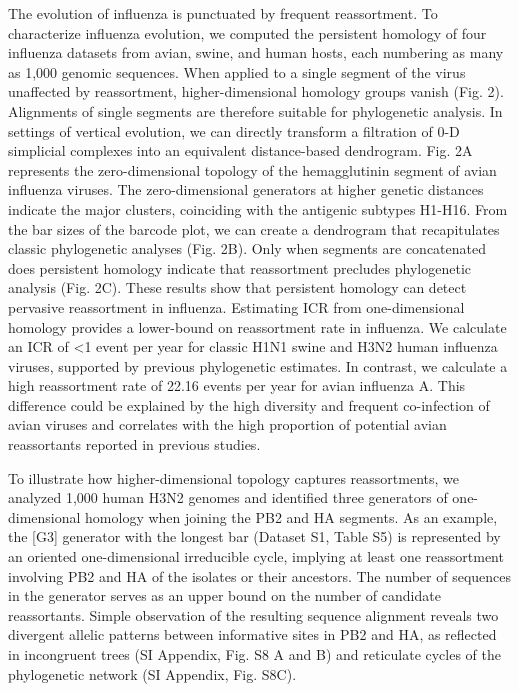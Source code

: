 The evolution of influenza is punctuated by frequent reassortment.
To characterize influenza evolution, we computed the persistent homology of four influenza datasets from avian, swine, and human hosts, each numbering as many as 1,000 genomic sequences.
When applied to a single segment of the virus unaffected by reassortment, higher-dimensional homology groups vanish (Fig. 2).
Alignments of single segments are therefore suitable for phylogenetic analysis.
In settings of vertical evolution, we can directly transform a filtration of 0-D simplicial complexes into an equivalent distance-based dendrogram.
Fig. 2A represents the zero-dimensional topology of the hemagglutinin segment of avian influenza viruses. 
The zero-dimensional generators at higher genetic distances indicate the major clusters, coinciding with the antigenic subtypes H1-H16.
From the bar sizes of the barcode plot, we can create a dendrogram that recapitulates classic phylogenetic analyses (Fig. 2B).
Only when segments are concatenated does persistent homology indicate that reassortment precludes phylogenetic analysis (Fig. 2C).
These results show that persistent homology can detect pervasive reassortment in influenza.
Estimating ICR from one-dimensional homology provides a lower-bound on reassortment rate in influenza.
We calculate an ICR of <1 event per year for classic H1N1 swine and H3N2 human influenza viruses, supported by previous phylogenetic estimates.
In contrast, we calculate a high reassortment rate of 22.16 events per year for avian influenza A.
This difference could be explained by the high diversity and frequent co-infection of avian viruses and correlates with the high proportion of potential avian reassortants reported in previous studies.

To illustrate how higher-dimensional topology captures reassortments, we analyzed 1,000 human H3N2 genomes and identified three generators of one-dimensional homology when joining the PB2 and HA segments.
As an example, the [G3] generator with the longest bar (Dataset S1, Table S5) is represented by an oriented one-dimensional irreducible cycle, implying at least one reassortment involving PB2 and HA of the isolates or their ancestors.
The number of sequences in the generator serves as an upper bound on the number of candidate reassortants.
Simple observation of the resulting sequence alignment reveals two divergent allelic patterns between informative sites in PB2 and HA, as reflected in incongruent trees (SI Appendix, Fig. S8 A and B) and reticulate cycles of the phylogenetic network (SI Appendix, Fig. S8C).

